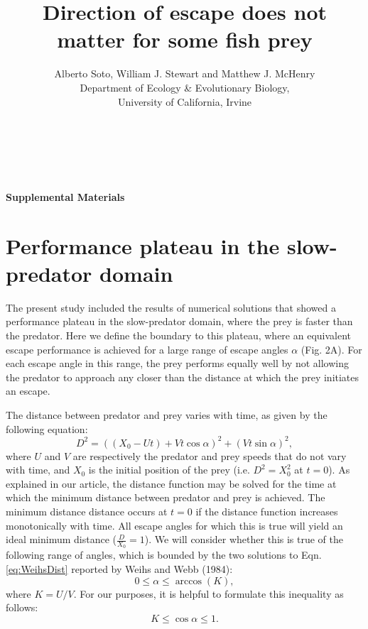\documentclass[12pt]{article}
\title{Direction of escape does not matter for some fish prey}
\author{Alberto Soto, William J. Stewart and Matthew J. McHenry\\
  Department of Ecology \& Evolutionary Biology,\\
  University of California, Irvine\\ \\ \\ \\}
\begin{document}

{\LARGE \textbf{Supplemental Materials}}


\section{Performance plateau in the slow-predator domain}
The present study included the results of numerical solutions that showed a performance plateau in the slow-predator domain, where the prey is faster than the predator. 
Here we define the boundary to this plateau, where an equivalent escape performance is achieved for a large range of escape angles $\alpha$ (Fig. 2A).
For each escape angle in this range, the prey performs equally well by not allowing the predator to approach any closer than the distance at which the prey initiates an escape.   

The distance between predator and prey varies with time, as given by the following equation:
%
\begin{equation}
D^2 = ((X_0 - Ut) + Vt\cos\alpha)^2 + (Vt\sin\alpha)^2,
\label{eq:WeihsDist}
\end{equation}
%
where $U$ and $V$ are respectively the predator and prey speeds that do not vary with time, and $X_0$ is the initial position of the prey (i.e. $D^2 = X_0^2$ at $t=0$). 
As explained in our article, the distance function may be solved for the time at which the minimum distance between predator and prey is achieved.  
The minimum distance distance occurs at $t=0$ if the distance function increases monotonically with time. 
All escape angles for which this is true will yield an ideal minimum distance ($\frac{D}{X_0}=1$).
We will consider whether this is true of the following range of angles, which is bounded by the two solutions to Eqn. \ref{eq:WeihsDist} reported by Weihs and Webb (1984):
%
\begin{equation}
0\leq \alpha \leq \arccos (K),
\label{eq:alphabound}
\end{equation}
where $K = U/V$. For our purposes, it is helpful to formulate this inequality as follows:
%
\begin{equation}
K \leq \cos\alpha \leq 1.
\label{eq:cosinebound}
\end{equation} 
%
\end{document}

